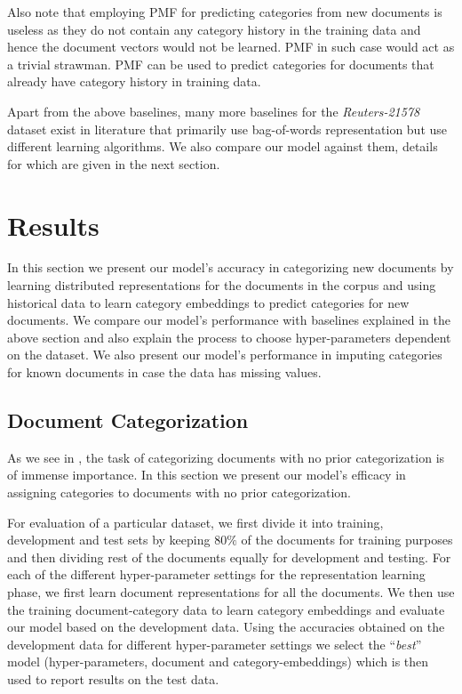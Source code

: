 \begin{enumerate}
Also note that employing PMF for predicting categories from new documents is useless as they do not contain any category history in the training data and hence the document vectors would not be learned. PMF in such case would act as a trivial strawman. PMF can be used to predict categories for documents that already have category history in training data. 

\end{enumerate}
Apart from the above baselines, many more baselines for the \emph{Reuters-21578} dataset exist in literature that primarily use bag-of-words representation but use different learning algorithms. We also compare our model against them, details for which are given in the next section.

\section{Results}
\label{sec:results}
In this section we present our model's accuracy in categorizing new documents by learning distributed representations for the documents in the corpus and using historical data to learn category embeddings to predict categories for new documents. We compare our model's performance with baselines explained in the above section and also explain the process to choose hyper-parameters dependent on the dataset. 
We also present our model's performance in imputing categories for known documents in case the data has missing values. 

\subsection{Document Categorization}
\label{sec:results:categorization}
As we see in , the task of categorizing documents with no prior categorization is of immense importance. In this section we present our model's efficacy in assigning categories to documents with no prior categorization. 

For evaluation of a particular dataset, we first divide it into training, development and test sets by keeping $80\%$ of the documents for training purposes and then dividing rest of the documents equally for development and testing. For each of the different hyper-parameter settings for the representation learning phase, we first learn document representations for all the documents. We then use the training document-category data to learn category embeddings and evaluate our model based on the development data. Using the accuracies obtained on the development data for different hyper-parameter settings we select the ``\emph{best}'' model (hyper-parameters, document and category-embeddings) which is then used to report results on the test data.

